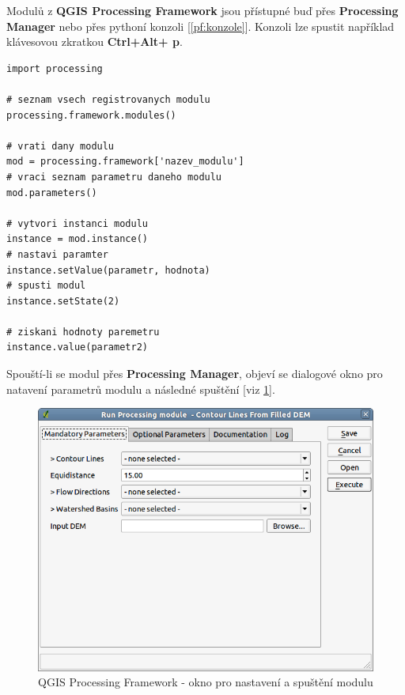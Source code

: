 Modulů z \textbf{QGIS Processing Framework} jsou přístupné buď přes \textbf{Processing Manager} nebo přes pythoní konzoli [\autoref{pf:konzole}]. Konzoli lze spustit například klávesovou zkratkou \textbf{Ctrl+Alt+ p}.

\begin{lstlisting}[label=pf:konzole,caption={Přístup k modulům přes konzoli.}] 
import processing

# seznam vsech registrovanych modulu
processing.framework.modules()
	
# vrati dany modulu
mod = processing.framework['nazev_modulu']
# vraci seznam parametru daneho modulu
mod.parameters()

# vytvori instanci modulu
instance = mod.instance()
# nastavi paramter
instance.setValue(parametr, hodnota)
# spusti modul
instance.setState(2)

# ziskani hodnoty paremetru
instance.value(parametr2)
\end{lstlisting}

Spouští-li se modul přes \textbf{Processing Manager}, objeví se dialogové okno pro natavení parametrů modulu a následné spuštění [viz \figurename \ref{pf:dialog}].

\begin{figure}[h]
	\centering
	\includegraphics[scale=0.5]{pictures/pf/processing_dialog}
	\caption{QGIS Processing Framework - okno pro nastavení a spuštění modulu}
  	\label{pf:dialog}
\end{figure}


